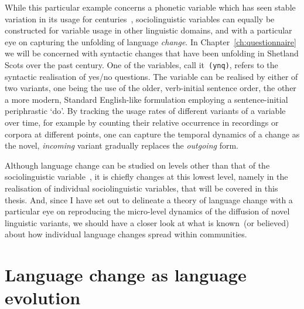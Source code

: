 While this particular example concerns a phonetic variable which has seen stable variation in its usage for centuries~\citep{Labov1989}, sociolinguistic variables can equally be constructed for variable usage in other linguistic domains, and with a particular eye on capturing the unfolding of language \emph{change}. In Chapter~\ref{ch:questionnaire} we will be concerned with syntactic changes that have been unfolding in Shetland Scots over the past century. One of the variables, call it~\texttt{(ynq)}, refers to the syntactic realisation of yes/no questions. The variable can be realised by either of two variants, one being the use of the older, verb-initial sentence order, the other a more modern, Standard English-like formulation employing a sentence-initial periphrastic `do'. By tracking the usage rates of different variants of a variable over time, for example by counting their relative occurrence in recordings or corpora at different points, one can capture the temporal dynamics of a change as the novel, \emph{incoming} variant gradually replaces the \emph{outgoing} form.


Although language change can be studied on levels other than that of the sociolinguistic variable~\citep[see in particular][p.98]{Croft2006}, it is chiefly changes at this lowest level, namely in the realisation of individual sociolinguistic variables, that will be covered in this thesis. And, since I have set out to delineate a theory of language change with a particular eye on reproducing the micro-level dynamics of the diffusion of novel linguistic variants, we should have a closer look at what is known~(or believed) about how individual language changes spread within communities.



\section{Language change as language evolution}\label{sec:evolutionaryapproaches}

